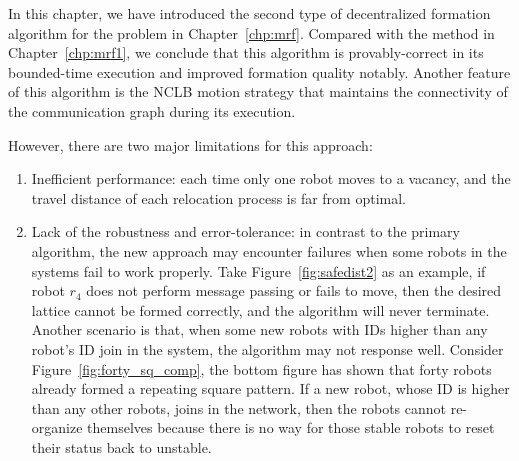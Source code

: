 In this chapter, we have introduced the second type of decentralized formation algorithm for the problem in Chapter~\ref{chp:mrf}.
%
Compared with the method in Chapter~\ref{chp:mrf1}, we conclude that this algorithm is provably-correct in its bounded-time execution and improved formation quality notably.
%
Another feature of this algorithm is the NCLB motion strategy that maintains the connectivity of the communication graph during its execution.



However, there are two major limitations for this approach:
\begin{enumerate}
\item Inefficient performance: each time only one robot moves to a vacancy, and the travel distance of each relocation process is far from optimal.
\item Lack of the robustness and error-tolerance: in contrast to the primary algorithm, the new approach may encounter failures when some robots in the systems fail to work properly. Take Figure~\ref{fig:safedist2} as an example, if robot $r_4$ does not perform message passing or fails to move, then the desired lattice cannot be formed correctly, and the algorithm will never terminate. 
Another scenario is that, when some new robots with IDs higher than any robot's ID join in the system, the algorithm may not response well. 
Consider Figure~\ref{fig:forty_sq_comp}, the bottom figure has shown that forty robots already formed a repeating square pattern. 
If a new robot, whose ID is higher than any other robots, joins in the network, then the robots cannot re-organize themselves because there is no way for those stable robots to reset their status back to unstable.
\end{enumerate}




